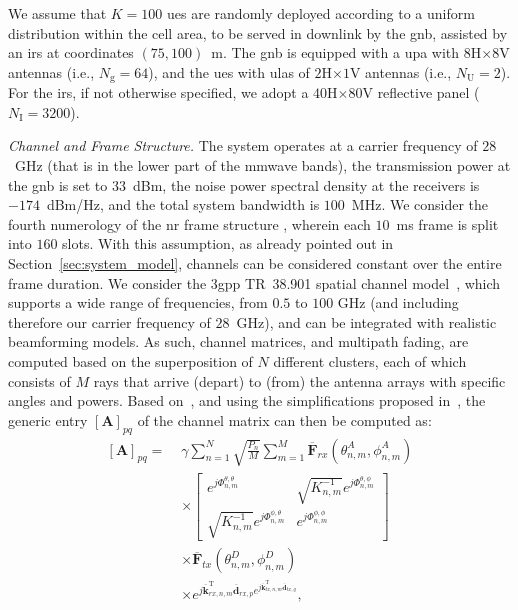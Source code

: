 We assume that $K=100$ \glspl{ue} are randomly deployed according to a uniform distribution within the cell area, to be served in downlink by the \gls{gnb}, assisted by an \gls{irs} at coordinates $(75, 100)$~m. 
The \gls{gnb} is equipped with a \gls{upa} with $8$H$\times8$V antennas (i.e., $N_{\mathrm g}=64$), and the \glspl{ue} with \glspl{ula} of $2$H$\times1$V antennas (i.e., $N_{\mathrm U} = 2$). 
For the \gls{irs}, if not otherwise specified, we adopt a $40$H$\times80$V reflective panel ($N_{\mathrm I}= 3200$).

\emph{Channel and Frame Structure.}
The system operates at a carrier frequency of $28$~GHz (that is in the lower part of the \gls{mmwave} bands), the transmission power at the \gls{gnb} is set to $33$~dBm, the noise power spectral density at the receivers is $-174$~dBm/Hz, and the total system bandwidth is $100$~MHz. We consider the fourth numerology of the \gls{nr} frame structure \cite{3gpp.38.211}, wherein each $10$~ms frame is split into $160$ slots. With this assumption, as already pointed out in Section~\ref{sec:system_model}, channels can be considered constant over the entire frame duration.
We consider the \gls{3gpp} TR~38.901 spatial channel model~\cite{3gpp.38.901}, which supports a wide range of frequencies, from $0.5$ to $100$ GHz (and including therefore our carrier frequency of $28$~GHz), and can be integrated with realistic beamforming models.
As such, channel matrices, and multipath fading, are computed based on the superposition of $N$ different clusters, each of which consists of $M$ rays that arrive (depart) to (from) the antenna arrays with specific angles and powers.
Based on~\cite{3gpp.38.901}, and using the simplifications proposed in~\cite{zugno20implementation}, the generic entry $[\bm{A}]_{pq}$ of the channel matrix can then be computed as:
\begin{equation}
\label{eq:ch_model_full}
\begin{aligned}
[\bm{A}]_{pq} = \; &\gamma \sum_{n=1}^{N} \sqrt{\frac{P_{n}}{M}} \sum_{m=1}^{M} \overline{\mathbf{F}}_{r x}\left(\theta_{n, m}^{A}, \phi_{n, m}^{A}\right) \\
& \times\left[\begin{array}{cr}
e^{j \Phi_{n, m}^{\theta, \theta}} & \sqrt{K_{n, m}^{-1}} e^{j \Phi_{n, m}^{\theta, \phi}} \\
\sqrt{K_{n, m}^{-1}} e^{j \Phi_{n, m}^{\phi, \theta}} & e^{j \Phi_{n, m}^{\phi, \phi}}
\end{array}\right] \\
& \times \overline{\mathbf{F}}_{tx}\left(\theta_{n, m}^{D}, \phi_{n, m}^{D}\right) \\
& \times e^{j \overline{\mathbf{k}}_{rx, n, m}^{\mathrm T} \overline{\mathbf{d}}_{rx, p} e^{j \overline{\mathbf{k}}_{tx, n, m}^{\mathrm T} \overline{\mathbf{d}}_{tx, q}}},
\end{aligned}
\end{equation}
